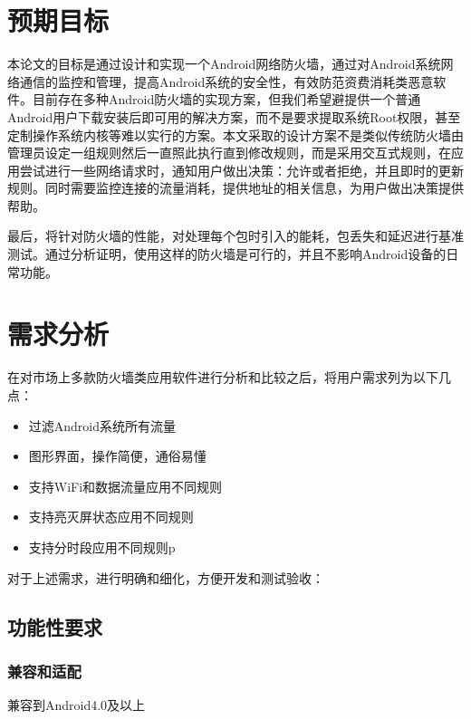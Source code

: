 \documentclass[format=final, language=chinese, degree=bachelor]{hustthesis}
\begin{document}
\section{预期目标}

本论文的目标是通过设计和实现一个Android网络防火墙，通过对Android系统网络通信的监控和管理，提高Android系统的安全性，有效防范资费消耗类恶意软件。目前存在多种Android防火墙的实现方案，但我们希望避提供一个普通Android用户下载安装后即可用的解决方案，而不是要求提取系统Root权限，甚至定制操作系统内核等难以实行的方案。本文采取的设计方案不是类似传统防火墙由管理员设定一组规则然后一直照此执行直到修改规则，而是采用交互式规则，在应用尝试进行一些网络请求时，通知用户做出决策：允许或者拒绝，并且即时的更新规则。同时需要监控连接的流量消耗，提供地址的相关信息，为用户做出决策提供帮助。


最后，将针对防火墙的性能，对处理每个包时引入的能耗，包丢失和延迟进行基准测试。通过分析证明，使用这样的防火墙是可行的，并且不影响Android设备的日常功能。

\section{需求分析}


在对市场上多款防火墙类应用软件进行分析和比较之后，将用户需求列为以下几点：
\begin{itemize}
	\item 过滤Android系统所有流量\label{item:1}
	\item 图形界面，操作简便，通俗易懂
	\item 支持WiFi和数据流量应用不同规则
	\item 支持亮灭屏状态应用不同规则
	\item 支持分时段应用不同规则p
\end{itemize}

对于上述需求，进行明确和细化，方便开发和测试验收：
\subsection{功能性要求}
\subsubsection{兼容和适配}
	
	兼容到Android4.0及以上
\end{document}
